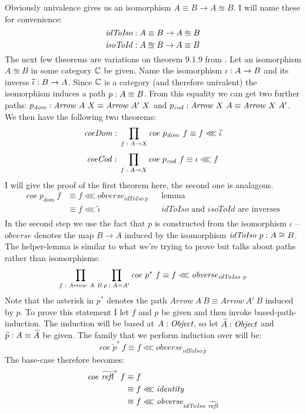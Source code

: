 Obviously univalence gives us an isomorphism $A \equiv B \to A \approxeq B$. I
will name these for convenience:
%
$$
\mathit{idToIso} \;\mathord{:}\; A \equiv B \to A \approxeq B
$$
%
$$
\mathit{isoToId} \;\mathord{:}\; A \approxeq B \to A \equiv B
$$
%
The next few theorems are variations on theorem 9.1.9 from \cite{HoTT-book}. Let
an isomorphism $A \approxeq B$ in some category $\mathbb{C}$ be given. Name the
isomorphism $\iota \;\mathord{:}\; A \to B$ and its inverse $\widetilde{\iota} \;\mathord{:}\; B \to A$.
Since $\mathbb{C}$ is a category (and therefore univalent) the isomorphism induces a
path $p \;\mathord{:}\; A \equiv B$. From this equality we can get two further paths:
$p_{\mathit{dom}} \;\mathord{:}\; \mathit{Arrow}\ A\ X \equiv \mathit{Arrow}\ A'\ X$ and
$p_{\mathit{cod}} \;\mathord{:}\; \mathit{Arrow}\ X\ A \equiv \mathit{Arrow}\ X\ A'$. We
then have the following two theorems:
%
$$
\mathit{coeDom} \;\mathord{:}\; \prod_{f \;\mathord{:}\; A \to X} \mathit{coe}\ p_{\mathit{dom}}\ f \equiv f \lll \widetilde{\iota}
$$
%
%
$$
\mathit{coeCod} \;\mathord{:}\; \prod_{f \;\mathord{:}\; A \to X} \mathit{coe}\ p_{\mathit{cod}}\ f \equiv \iota \lll f
$$
%
I will give the proof of the first theorem here, the second one is analagous.
\begin{align*}
\mathit{coe}\ p_{\mathit{dom}}\ f
  & \equiv f \lll \mathit{obverse}_{\mathit{idToIso}\ p} && \text{lemma} \\
  & \equiv f \lll \widetilde{\iota}
    && \text{$\mathit{idToIso}$ and $\mathit{isoToId}$ are inverses}\\
\end{align*}
%
In the second step we use the fact that $p$ is constructed from the isomorphism
$\iota$ -- $\mathit{obverse}$ denotes the map $B \to A$ induced by the
isomorphism $\mathit{idToIso}\ p \tp A \cong B$. The helper-lemma is similar to
what we're trying to prove but talks about paths rather than isomorphisms:
%
$$
\prod_{f \;\mathord{:}\; \mathit{Arrow}\ A\ B} \prod_{p \;\mathord{:}\; A \equiv A'} \mathit{coe}\ p^*\ f \equiv f \lll \mathit{obverse}_{\mathit{idToIso}\ p}
$$
%
Note that the asterisk in $p^*$ denotes the path $\mathit{Arrow}\ A\ B \equiv
\mathit{Arrow}\ A'\ B$ induced by $p$. To prove this statement I let $f$ and $p$
be given and then invoke based-path-induction. The induction will be based at $A
\;\mathord{:}\; \mathit{Object}$, so let $\widetilde{A} \;\mathord{:}\; \mathit{Object}$ and $\widetilde{p} \;\mathord{:}\;
A \equiv \widetilde{A}$ be given. The family that we perform induction over will
be:
%
$$
\mathit{coe}\ {\widetilde{p}}^*\ f \equiv f \lll \mathit{obverse}_{\mathit{idToIso}\ \widetilde{p}}
$$
The base-case therefore becomes:
\begin{align*}
\mathit{coe}\ {\widetilde{\refl}}^*\ f
& \equiv f \\
& \equiv f \lll \mathit{identity} \\
& \equiv f \lll \mathit{obverse}_{\mathit{idToIso}\ \widetilde{\refl}}
\end{align*}
